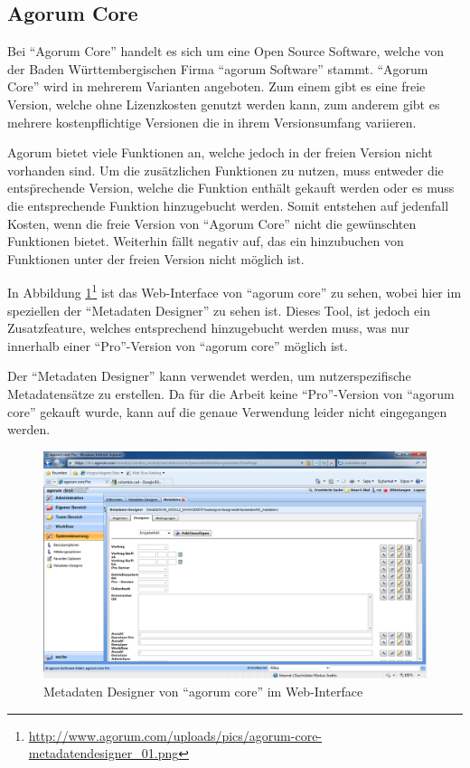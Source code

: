\subsection{Agorum Core}
Bei "`Agorum Core"' handelt es sich um eine Open Source Software, welche von der Baden W\"urttembergischen Firma "`agorum Software"' stammt. "`Agorum Core"' wird in mehrerem Varianten angeboten. Zum einem gibt es eine freie Version, welche ohne Lizenzkosten genutzt werden kann, zum anderem gibt es mehrere kostenpflichtige Versionen die in ihrem Versionsumfang variieren. \cite{agorum_home} 

Agorum bietet viele Funktionen an, welche jedoch in der freien Version nicht vorhanden sind. Um die zus\"atzlichen Funktionen zu nutzen, muss entweder die ents\"prechende Version, welche die Funktion enth\"alt gekauft werden oder es muss die entsprechende Funktion hinzugebucht werden.
Somit entstehen auf jedenfall Kosten, wenn die freie Version von "`Agorum Core"' nicht die gew\"unschten Funktionen bietet. Weiterhin f\"allt negativ auf, das ein hinzubuchen von Funktionen unter der freien Version nicht m\"oglich ist. \cite{agorum_preise} \cite{Eval_DMS_Bachelor}

In Abbildung \ref{metadatendesigner agorum}\footnote{\url{http://www.agorum.com/uploads/pics/agorum-core-metadatendesigner_01.png}} ist das Web-Interface von "`agorum core"' zu sehen, wobei hier im speziellen der "`Metadaten Designer"' zu sehen ist. Dieses Tool, ist jedoch ein Zusatzfeature, welches entsprechend hinzugebucht werden muss, was nur innerhalb einer "`Pro"'-Version von "`agorum core"' m\"oglich ist. \cite{agorum_metadesigner_bild}

Der "`Metadaten Designer"' kann verwendet werden, um nutzerspezifische Metadatens\"atze zu erstellen.  Da f\"ur die Arbeit keine "`Pro"'-Version von "`agorum core"' gekauft wurde, kann auf die genaue Verwendung leider nicht eingegangen werden. \cite{agorum_metadaten_designer_video}

\begin{figure}[!ht]
\centering
\includegraphics[width=16cm]{Bilder/agorum-core-metadatendesigner.png}
\caption{Metadaten Designer von "`agorum core"' im Web-Interface}
\label{metadatendesigner agorum}
\centering
\end{figure}

